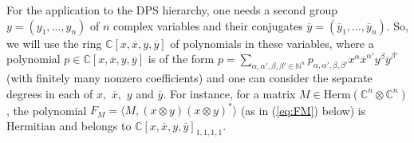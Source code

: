 \documentclass[11pt]{article}
\newcommand{\N}{\ensuremath{\mathbb{N}}}   %
\newcommand{\C}{\ensuremath{\mathbb{C}}} %
\newcommand{\Herm}{\mathrm{Herm}}
\newcommand{\Cnn}{\C^n\ot \C^n}
\newcommand{\ot}{\otimes}
\newcommand{\ovx}{\overline x}
\newcommand{\ovy}{\overline y}
\theoremstyle{plain}
\newcommand{\ML}{\textcolor{blue}}
\newcommand{\ignore}[1]{}
\begin{document}
\smallskip
For the application to the DPS hierarchy, one needs a second group $y=(y_1,\ldots,y_n)$ of $n$ complex variables  and their conjugates 
$\ovy=(\ovy_1,\ldots,\ovy_n)$. So, we will use the ring  $\C[x,\ovx,y,\ovy]$ of polynomials in these variables, where a polynomial 
$p\in \C[x,\ovx,y,\ovy]$ is of the form
$p=\sum_{\alpha, \alpha',\beta,\beta'\in\N^n} p_{\alpha,\alpha',\beta,\beta'}x^\alpha \ovx^{\alpha'}y^{\beta}\ovy^{\beta'}$ (with finitely many nonzero coefficients) and one can consider the separate degrees in each of $x,$ $\ovx,$ $y$ and $\ovy$.  
For instance, for a matrix $M\in \Herm(\Cnn)$, the polynomial $F_M=\langle M, (x\ot y)(x\ot y)^*\rangle$ (as in (\ref{eq:FM}) below) is Hermitian and 
 belongs to $ \C[x,\ovx,y,\ovy]_{1,1,1,1}$. 


\ignore{
A Hermitian polynomial $p$ is said to be a 
{\em real-sum of squares} (r-sos, for short) if $p=\sum_{\ell=1}^m q_\ell  \overline {q_\ell}$ for some $q_\ell \in  \C[x,\ovx,y,\ovy]$  or, equivalently, if $p=\sum_{\ell=1}q_\ell^2$ for some Hermitian polynomials $q_\ell$ and $m\ge 1$ (see Lemma \ref{lem:rsos-sos}). Here, one stresses  `real'-sos in order to distinguish from the other notion of {\em complex sum of squares} (c-sos) where one would restrict to $q_\ell\in \C[x,y]$. Being r-sos is a much stronger notion than c-sos (and it corresponds to requiring that both the real and imaginary parts are sums of squares of real polynomials).
See Appendix \ref{sec:proof-lemma} for  more details.

\medskip
$L\in  \C[x,\ovx,y,\ovy]^*$ is nonnegative \ML{To do later - see what is needed.}
 }
 
\end{document}
